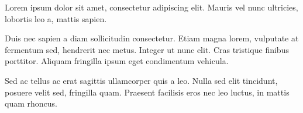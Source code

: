 
Lorem ipsum dolor sit amet, consectetur adipiscing elit.
Mauris vel nunc ultricies, lobortis leo a, mattis sapien.

Duis nec sapien a diam sollicitudin consectetur.
Etiam magna lorem, vulputate at fermentum sed, hendrerit nec metus.
Integer ut nunc elit.
Cras tristique finibus porttitor.
Aliquam fringilla ipsum eget condimentum vehicula.

Sed ac tellus ac erat sagittis ullamcorper quis a leo.
Nulla sed elit tincidunt, posuere velit sed, fringilla quam.
Praesent facilisis eros nec leo luctus, in mattis quam rhoncus.

